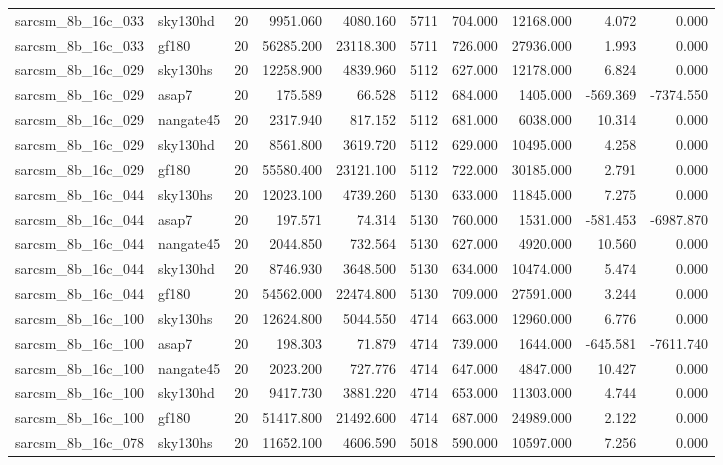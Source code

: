 \begin{tabular}{llrrrrrrrr}
sarcsm\_8b\_16c\_033 & sky130hd & 20 & 9951.060 & 4080.160 & 5711 & 704.000 & 12168.000 & 4.072 & 0.000 \\
sarcsm\_8b\_16c\_033 & gf180 & 20 & 56285.200 & 23118.300 & 5711 & 726.000 & 27936.000 & 1.993 & 0.000 \\
sarcsm\_8b\_16c\_029 & sky130hs & 20 & 12258.900 & 4839.960 & 5112 & 627.000 & 12178.000 & 6.824 & 0.000 \\
sarcsm\_8b\_16c\_029 & asap7 & 20 & 175.589 & 66.528 & 5112 & 684.000 & 1405.000 & -569.369 & -7374.550 \\
sarcsm\_8b\_16c\_029 & nangate45 & 20 & 2317.940 & 817.152 & 5112 & 681.000 & 6038.000 & 10.314 & 0.000 \\
sarcsm\_8b\_16c\_029 & sky130hd & 20 & 8561.800 & 3619.720 & 5112 & 629.000 & 10495.000 & 4.258 & 0.000 \\
sarcsm\_8b\_16c\_029 & gf180 & 20 & 55580.400 & 23121.100 & 5112 & 722.000 & 30185.000 & 2.791 & 0.000 \\
sarcsm\_8b\_16c\_044 & sky130hs & 20 & 12023.100 & 4739.260 & 5130 & 633.000 & 11845.000 & 7.275 & 0.000 \\
sarcsm\_8b\_16c\_044 & asap7 & 20 & 197.571 & 74.314 & 5130 & 760.000 & 1531.000 & -581.453 & -6987.870 \\
sarcsm\_8b\_16c\_044 & nangate45 & 20 & 2044.850 & 732.564 & 5130 & 627.000 & 4920.000 & 10.560 & 0.000 \\
sarcsm\_8b\_16c\_044 & sky130hd & 20 & 8746.930 & 3648.500 & 5130 & 634.000 & 10474.000 & 5.474 & 0.000 \\
sarcsm\_8b\_16c\_044 & gf180 & 20 & 54562.000 & 22474.800 & 5130 & 709.000 & 27591.000 & 3.244 & 0.000 \\
sarcsm\_8b\_16c\_100 & sky130hs & 20 & 12624.800 & 5044.550 & 4714 & 663.000 & 12960.000 & 6.776 & 0.000 \\
sarcsm\_8b\_16c\_100 & asap7 & 20 & 198.303 & 71.879 & 4714 & 739.000 & 1644.000 & -645.581 & -7611.740 \\
sarcsm\_8b\_16c\_100 & nangate45 & 20 & 2023.200 & 727.776 & 4714 & 647.000 & 4847.000 & 10.427 & 0.000 \\
sarcsm\_8b\_16c\_100 & sky130hd & 20 & 9417.730 & 3881.220 & 4714 & 653.000 & 11303.000 & 4.744 & 0.000 \\
sarcsm\_8b\_16c\_100 & gf180 & 20 & 51417.800 & 21492.600 & 4714 & 687.000 & 24989.000 & 2.122 & 0.000 \\
sarcsm\_8b\_16c\_078 & sky130hs & 20 & 11652.100 & 4606.590 & 5018 & 590.000 & 10597.000 & 7.256 & 0.000 \\

\end{tabular}
